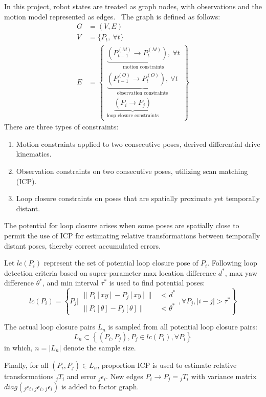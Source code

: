 \documentclass[conference]{IEEEtran}
\begin{document}
In this project, robot states are treated as graph nodes, 
with observations and the motion model represented as edges. \
The graph is defined as follows:
$$
\begin{aligned}
G &= (V, E) \\
V &= \{ P_{t},\ \forall t\} \\
E &= \left\{ \begin{gathered}
\underbrace{(P^{(M)}_{t-1} \rightarrow P^{(M)}_{t}),\ \forall t}_{\text{motion constraints}} \\
\underbrace{(P^{(O)}_{t-1} \rightarrow P^{(O)}_{t}),\ \forall t}_{\text{observation constraints}} \\
\underbrace{(P_{i} \rightarrow P_{j})}_{\text{loop closure constraints}}
\end{gathered} \right\}
\end{aligned}
$$
There are three types of constraints:
\begin{enumerate}
\item Motion constraints applied to two consecutive poses, derived differential drive kinematics.
\item Observation constraints on two consecutive poses, utilizing scan matching (ICP).
\item Loop closure constraints on poses that are spatially proximate yet temporally distant.
\end{enumerate}

The potential for loop closure arises when some poses are spatially close 
to permit the use of ICP for estimating relative transformations 
between temporally distant poses, thereby correct accumulated errors.

Let $lc(P_i)$ represent the set of potential loop closure pose of $P_i$.
Following loop detection criteria based on super-parameter 
max location difference $d^*$, max yaw difference $\theta^*$, and min interval $\tau^*$
is used to find potential poses:
$$
lc(P_i) = \left\{P_j \bigg| 
\begin{aligned}
    \| P_{i}[xy]-P_{j}[xy]\| &< d^*\\ 
    \| P_{i}[\theta]-P_{j}[\theta]\| &< \theta^*
\end{aligned} 
, \forall P_j, |i-j|>\tau^*\right\}
$$

The actual loop closure pairs $L_n$ is sampled from all potential loop closure pairs:
$$L_n \subset  \left\{(P_i, P_j), P_j \in lc(P_i), \forall P_i\right\}$$
in which, $n = |L_n|$ denote the sample size.

Finally, for all $(P_i, P_j)\in L_n$, proportion ICP is used to 
estimate relative transformations $_jT_i$ and 
error $_j\epsilon_i$. New edges $P_i\rightarrow P_j = {}_jT_i$ with 
variance matrix $diag({}_j\epsilon_i, {}_j\epsilon_i, {}_j\epsilon_i)$ 
is added to factor graph.
\end{document}
